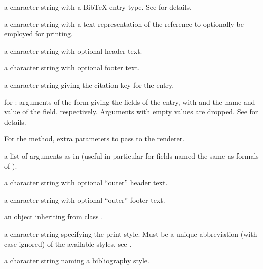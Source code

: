 \begin{Arguments}
\begin{ldescription}
\item[\code{bibtype}] a character string with a BibTeX entry type.
See  for details.

\item[\code{textVersion}] a character string with a text representation of
the reference to optionally be employed for printing.
\item[\code{header}] a character string with optional header text.
\item[\code{footer}] a character string with optional footer text.
\item[\code{key}] a character string giving the citation key for the entry.
\item[\code{...}] for : arguments of the form
 giving the fields of the entry, with
 and  the name and value of the field,
respectively.  Arguments with empty values are dropped.
See  for details.

For the  method, extra parameters to pass to the
renderer.
\item[\code{other}] a list of arguments as in  (useful in
particular for fields named the same as formals of
).
\item[\code{mheader}] a character string with optional ``outer'' header
text.
\item[\code{mfooter}] a character string with optional ``outer'' footer
text.
\item[\code{x}] an object inheriting from class .
\item[\code{style}] a character string specifying the print style.
Must be a unique abbreviation (with case ignored) of the available
styles, see .
\item[\code{.bibstyle}] a character string naming a bibliography style.
\end{ldescription}
\end{Arguments}
%
